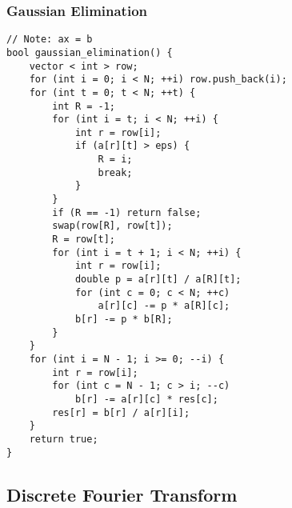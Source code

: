 \documentclass[10pt,landscape]{article}
\begin{document}
\begin{multicols}{2}
\subsubsection{Gaussian Elimination}
\begin{lstlisting}
// Note: ax = b
bool gaussian_elimination() {
    vector < int > row;
    for (int i = 0; i < N; ++i) row.push_back(i);
    for (int t = 0; t < N; ++t) {
        int R = -1;
        for (int i = t; i < N; ++i) {
            int r = row[i];
            if (a[r][t] > eps) {
                R = i;
                break;
            }
        }
        if (R == -1) return false;
        swap(row[R], row[t]);
        R = row[t];
        for (int i = t + 1; i < N; ++i) {
            int r = row[i];
            double p = a[r][t] / a[R][t];
            for (int c = 0; c < N; ++c)
                a[r][c] -= p * a[R][c];
            b[r] -= p * b[R];
        }
    }
    for (int i = N - 1; i >= 0; --i) {
        int r = row[i];
        for (int c = N - 1; c > i; --c)
            b[r] -= a[r][c] * res[c];
        res[r] = b[r] / a[r][i];
    }
    return true;
}
\end{lstlisting}
\subsection{Discrete Fourier Transform}

\end{multicols}
\end{document}

